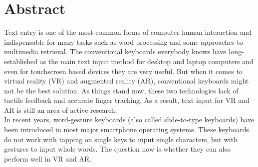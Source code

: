 \chapter{Abstract}
Text-entry is one of the most common forms of computer-human interaction and indispensable for many tasks such as word processing and some approaches to multimedia retrieval. The conventional keyboards everybody knows have long-established as the main text input method for desktop and laptop computers and even for touchscreen based devices they are very useful. But when it comes to virtual reality (VR) and augmented reality (AR), conventional keyboards might not be the best solution. As things stand now, these two technologies lack of tactile feedback and accurate finger tracking. As a result, text input for VR and AR is still an area of active research.\\
In recent years, word-gesture keyboards (also called slide-to-type keyboards) have been introduced in most major smartphone operating systems. These keyboards do not work with tapping on single keys to input single characters, but with gestures to input whole words. The question now is whether they can also perform well in VR and AR.